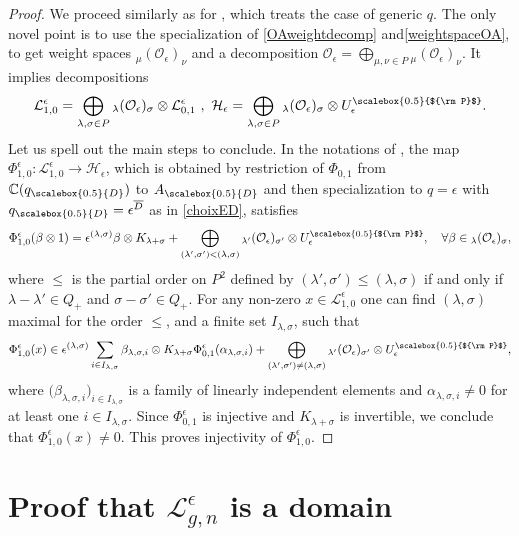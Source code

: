 \documentclass[11pt]{amsart}
\newcommand{\e}{\epsilon}
\newcommand{\mc}{\mathbb{C}}
\newcommand{\Ll}{\mathcal{L}}
\newcommand{\Oo}{\mathcal{O}}
\newcommand{\qD}{q_{\scalebox{0.5}{D}}}
\newcommand{\D}{{\scalebox{0.5}{D}}}
\newcommand{\Pup}{{\scalebox{0.5}{${\rm P}$}}}
\begin{document}
\begin{proof}
We proceed similarly as for \cite[Th.\,3.11]{BFR}, which treats the case of generic $q$. The only novel point is to use the specialization of \eqref{OAweightdecomp} and\eqref{weightspaceOA}, to get weight spaces ${}_\mu\!\left(\Oo_\e\right)_{\nu}$ and a decomposition $\textstyle \Oo_\e = \bigoplus_{\mu,\nu\in P} {}_\mu\!\left(\Oo_\e\right)_{\nu}$. It implies decompositions
\[ \mathcal{L}_{1,0}^{\e} = \bigoplus_{\lambda, \sigma \in P} {_{\lambda}(\mathcal{O}_{\e})_{\sigma}} \otimes  \mathcal{L}_{0,1}^{\e}\ , \ \mathcal{H}_{\e} = \bigoplus_{\lambda,\sigma \in P} {_{\lambda}(\mathcal{O}_{\e})_{\sigma}} \otimes U_\e^\Pup. \]
Let us spell out the main steps to conclude. In the notations of \cite[Th.\,3.13]{BFR}, the map $\Phi_{1,0}^{\e} \colon \mathcal{L}_{1,0}^{\e} \rightarrow \mathcal{H}_{\e}$, which is obtained by restriction of $\Phi_{0,1}$ from $\mc(\qD)$ to $A_\D$ and then specialization to $q =\e$ with $\qD = \e^{\overline{D}}$ as in \eqref{choixED}, satisfies
\[ \Phi_{1,0}^{\e} (\beta  \otimes 1) = \e^{(\lambda,\sigma)} \beta \otimes  K_{\lambda + \sigma} + \bigoplus_{(\lambda',\sigma') < (\lambda,\sigma)} {_{\lambda'}(\mathcal{O}_\e)_{\sigma'}} \otimes U_\e^\Pup,\quad \forall\beta\in {_{\lambda}(\mathcal{O}_{\e})_{\sigma}},\]
where $\leq$ is the partial order on $P^2$ defined by  $(\lambda',\sigma') \leq (\lambda,\sigma)$ if and only if $\lambda - \lambda' \in Q_+$ and $\sigma - \sigma' \in Q_+$. For any non-zero $x \in \mathcal{L}_{1,0}^{\e}$ one can find $(\lambda,\sigma)$ maximal for the order $\leq$, and a finite set $I_{\lambda,\sigma}$, such that 
\[ \Phi_{1,0}^{\e}(x) \in \e^{(\lambda,\sigma)} \sum_{i \in I_{\lambda,\sigma}} \beta_{\lambda, \sigma,i} \otimes  K_{\lambda + \sigma}\Phi_{0,1}^{\e}(\alpha_{\lambda,\sigma,i}) + \bigoplus_{(\lambda',\sigma') \neq (\lambda,\sigma)} {_{\lambda'}(\mathcal{O}_\e)_{\sigma'}} \otimes U_\e^\Pup, \]
where $\bigl(\beta_{\lambda,\sigma,i}\bigr)_{i \in I_{\lambda, \sigma}}$ is a family of linearly independent elements and $\alpha_{\lambda,\sigma,i} \neq 0$ for at least one $i\in I_{\lambda,\sigma}$. Since $\Phi_{0,1}^{\e}$ is injective \cite[Cor.\,2.25]{BR2} and $K_{\lambda+\sigma}$ is invertible, we conclude that $\Phi_{1,0}^{\e}(x) \neq 0$. This proves injectivity of $\Phi_{1,0}^{\e}$.
\end{proof}

\section{Proof that \texorpdfstring{$\Ll_{g,n}^{\e}$}{specialized graph algebra} is a domain}\label{Lgndomain}
\end{document}

